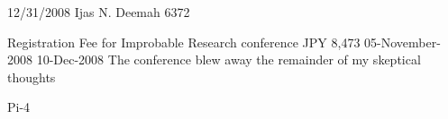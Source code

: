 \documentclass[a4,14pt]{form3}
\begin{document}
\sealbox %

  \appdetails
  { 12/31/2008}   %
  {Ijas N. Deemah} %
  {6372} %

\begin{report}
  \details
      {Registration Fee for Improbable Research conference}
      {JPY 8,473}         %
      {05-November-2008}  %
      {10-Dec-2008}        %
      {The conference blew away the remainder of my skeptical thoughts}   %
\end{report}

\begin{misc}
  \miscbudget
      {Pi-4}  %
\end{misc}
\end{document}
